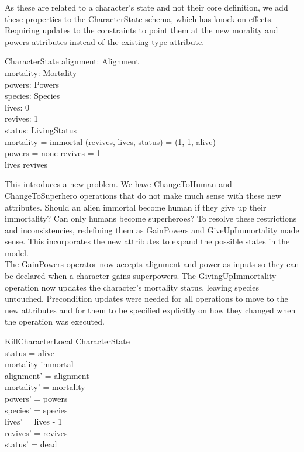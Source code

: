 \documentclass{article}
\begin{document}
\hspace{-0.64cm} As these are related to a character's state and not their core definition, we add these properties to the CharacterState schema, which has knock-on effects. Requiring updates to the constraints to point them at the new morality and powers attributes instead of the existing type attribute.
\begin{schema}{CharacterState}
alignment: Alignment \\
mortality: Mortality \\
powers: Powers \\
species: Species \\
lives: 0   \\ 
revives: 1  \\ 
status: LivingStatus \\
\where
mortality = immortal \implies (revives, lives, status) = (1, 1, alive) \\
powers = none \implies revives = 1 \\ 
lives \leq revives \\
\end{schema}

\hspace{-0.7cm} This introduces a new problem. We have ChangeToHuman and ChangeToSuperhero operations that do not make much sense with these new attributes. Should an alien immortal become human if they give up their immortality? Can only humans become superheroes? To resolve these restrictions and inconsistencies, redefining them as GainPowers and GiveUpImmortality made sense. This incorporates the new attributes to expand the possible states in the model. \\
\newline
The GainPowers operator now accepts alignment and power as inputs so they can be declared when a character gains superpowers. The GivingUpImmortality operation now updates the character's mortality status, leaving species untouched. Precondition updates were needed for all operations to move to the new attributes and for them to be specified explicitly on how they changed when the operation was executed.
\begin{schema}{KillCharacterLocal} 
\Delta CharacterState \\
\where
status = alive \\
mortality \neq immortal \\
alignment' = alignment \\
mortality' = mortality \\
powers' = powers \\ 
species' = species \\
lives' = lives - 1 \\
revives' = revives \\
status' = dead \\
\end{schema}
\end{document}
